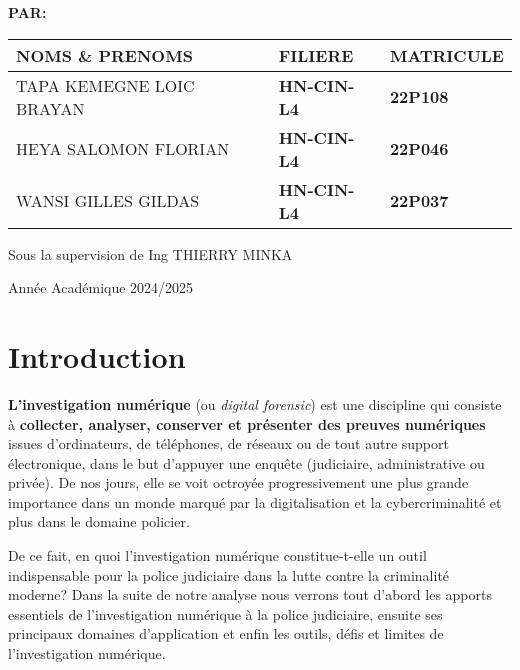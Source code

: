 \documentclass[12pt,a4paper]{article}
\begin{document}
\begin{titlepage}
	
	
	\begin{flushleft}
	\textbf{PAR:}
	\end{flushleft}
    \begin{tabular}{|>{\centering\arraybackslash}p{7cm}|>{\centering\arraybackslash}p{4cm}|>{\centering\arraybackslash}p{3cm}|}
        \hline
        \textbf{NOMS \& PRENOMS} & \textbf{FILIERE  } & \textbf{MATRICULE} \\
        \hline
        TAPA KEMEGNE LOIC BRAYAN & \textbf{HN-CIN-L4} & \textbf{22P108} \\
        \hline
        HEYA SALOMON FLORIAN & \textbf{HN-CIN-L4} & \textbf{22P046} \\
        \hline
        WANSI GILLES GILDAS & \textbf{HN-CIN-L4} & \textbf{22P037} \\
        \hline
    \end{tabular}

    \vspace{1cm}
	\begin{Large}
	Sous la supervision de Ing THIERRY MINKA
	\end{Large}
    
    \vspace{1cm}
	\begin{large}
	Année Académique 2024/2025
	\end{large}
\end{titlepage}

\tableofcontents
\thispagestyle{empty}
\newpage

\setcounter{page}{1}

\section{Introduction}

\textbf{L'investigation numérique} (ou \emph{digital forensic}) est une discipline qui consiste à \textbf{collecter, analyser, conserver et présenter des preuves numériques} issues d'ordinateurs, de téléphones, de réseaux ou de tout autre support électronique, dans le but d'appuyer une enquête (judiciaire, administrative ou privée). De nos jours, elle se voit octroyée progressivement une plus grande importance dans un monde marqué par la digitalisation et la cybercriminalité et plus dans le domaine policier. 

De ce fait, en quoi l'investigation numérique constitue-t-elle un outil indispensable pour la police judiciaire dans la lutte contre la criminalité moderne? Dans la suite de notre analyse nous verrons tout d'abord les apports essentiels de l'investigation numérique à la police judiciaire, ensuite ses principaux domaines d'application et enfin les outils, défis et limites de l'investigation numérique.
\end{document}
